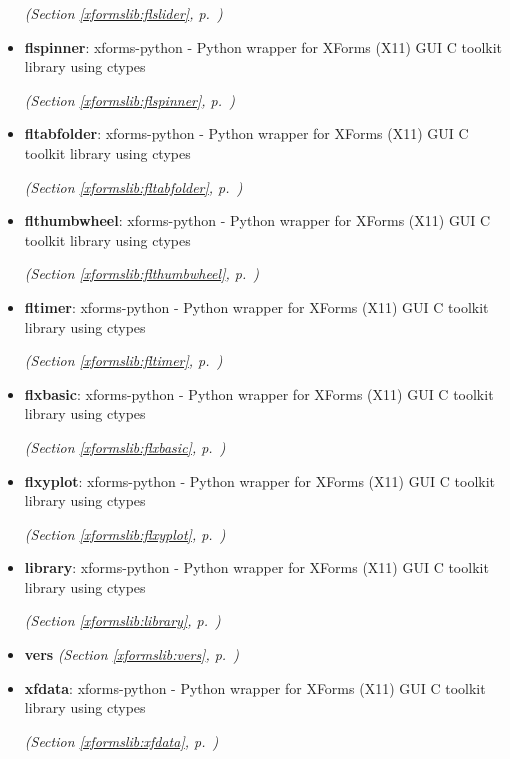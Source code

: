 \begin{itemize}
  \textit{(Section \ref{xformslib:flslider}, p.~\pageref{xformslib:flslider})}

\item \textbf{flspinner}: xforms-python - Python wrapper for XForms (X11) GUI C toolkit library using
ctypes



  \textit{(Section \ref{xformslib:flspinner}, p.~\pageref{xformslib:flspinner})}

\item \textbf{fltabfolder}: xforms-python - Python wrapper for XForms (X11) GUI C toolkit library using
ctypes



  \textit{(Section \ref{xformslib:fltabfolder}, p.~\pageref{xformslib:fltabfolder})}

\item \textbf{flthumbwheel}: xforms-python - Python wrapper for XForms (X11) GUI C toolkit library using
ctypes



  \textit{(Section \ref{xformslib:flthumbwheel}, p.~\pageref{xformslib:flthumbwheel})}

\item \textbf{fltimer}: xforms-python - Python wrapper for XForms (X11) GUI C toolkit library using
ctypes



  \textit{(Section \ref{xformslib:fltimer}, p.~\pageref{xformslib:fltimer})}

\item \textbf{flxbasic}: xforms-python - Python wrapper for XForms (X11) GUI C toolkit library using
ctypes



  \textit{(Section \ref{xformslib:flxbasic}, p.~\pageref{xformslib:flxbasic})}

\item \textbf{flxyplot}: xforms-python - Python wrapper for XForms (X11) GUI C toolkit library using
ctypes



  \textit{(Section \ref{xformslib:flxyplot}, p.~\pageref{xformslib:flxyplot})}

\item \textbf{library}: xforms-python - Python wrapper for XForms (X11) GUI C toolkit library using
ctypes



  \textit{(Section \ref{xformslib:library}, p.~\pageref{xformslib:library})}

\item \textbf{vers}
  \textit{(Section \ref{xformslib:vers}, p.~\pageref{xformslib:vers})}

\item \textbf{xfdata}: xforms-python - Python wrapper for XForms (X11) GUI C toolkit library using
ctypes



  \textit{(Section \ref{xformslib:xfdata}, p.~\pageref{xformslib:xfdata})}

\end{itemize}

